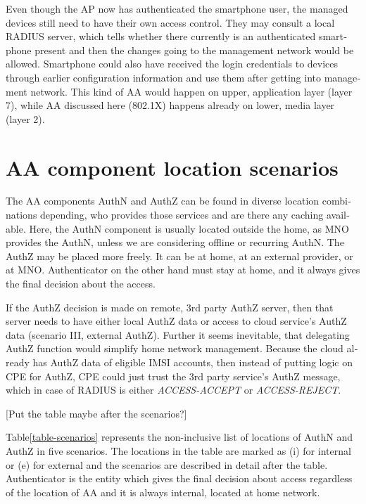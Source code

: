 \documentclass[12pt,a4paper,english]{tutthesis}
\begin{document}
\begin{otherlanguage}{english}
Even though the AP now has authenticated the smartphone user, the managed devices still 
need to have their own access control.
They may consult a local RADIUS server, which tells whether there currently is an
authenticated smartphone present and then the changes going
to the management network would be allowed. Smartphone could also have
received the login credentials to devices through earlier 
configuration information and use them after getting into management
network. This kind of AA would happen on upper, application layer
(layer 7), while AA discussed here (802.1X) happens already on lower, media layer (layer 2).

\section{AA component location scenarios}
\label{sec-4-2}


The AA components AuthN and AuthZ can be found in diverse location
combinations
depending, who provides those services and are there any caching
available. 
Here, the AuthN component 
is usually located outside the home, as MNO provides the AuthN, unless
we are considering offline or recurring AuthN.
The AuthZ may be placed more freely. It can be at
home, at an external provider, or at MNO.
Authenticator on the other hand must stay at home, and it always 
gives the final decision about the access.

If the AuthZ decision is made on remote, 3rd party AuthZ server, 
then that server needs to have either local AuthZ data or access to 
cloud service's AuthZ data (scenario III, external AuthZ).
Further it seems inevitable, that delegating AuthZ function 
would simplify home network management. Because the cloud
already 
has AuthZ data of eligible IMSI accounts,
then instead of putting logic on CPE for AuthZ, CPE
could just trust the 3rd party service's AuthZ message, which in case
of RADIUS is either \emph{ACCESS-ACCEPT} or \emph{ACCESS-REJECT}.


[Put the table maybe after the scenarios?]

Table\ref{table-scenarios} represents the non-inclusive list of locations of
AuthN and AuthZ in five scenarios. The locations in the table are marked as (i)
for internal or (e) for external and the scenarios are
described in detail after the table. Authenticator is the entity which
gives the final decision about access regardless of the location of AA
and it is always internal, located at home network.


\end{otherlanguage}
\end{document}
